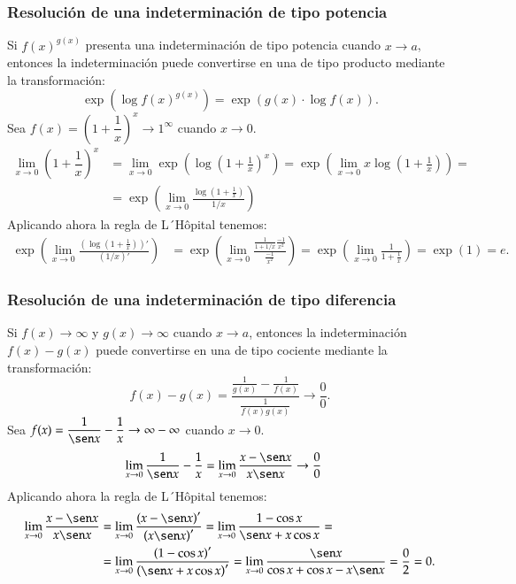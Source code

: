 	
	\begin{frame}
		\frametitle{Resolución de una indeterminación de tipo potencia}
		Si $f(x)^{g(x)}$ presenta una indeterminación de tipo potencia cuando $x\rightarrow a$, entonces la indeterminación puede convertirse en una de tipo producto mediante la transformación:
		\[
			\exp\left(\log f(x)^{g(x)}\right) = \exp\left(g(x)\cdot \log f(x)\right).
		\]
		 Sea $f(x)=\left(1+\dfrac{1}{x}\right)^{x} \rightarrow 1^\infty$ cuando $x\rightarrow 0$.
		\begin{align*}
			\lim_{x\rightarrow 0}\left(1+\dfrac{1}{x}\right)^{x} & = \lim_{x\rightarrow                                                               
			0}\exp\left(\log\left(1+\frac{1}{x}\right)^{x}\right) = \exp\left(\lim_{x\rightarrow
			0}x\log\left(1+\frac{1}{x}\right)\right) =\\
			                                                     & = \exp\left(\lim_{x\rightarrow 0}\frac{\log\left(1+\frac{1}{x}\right)}{1/x}\right) 
		\end{align*}
		Aplicando ahora la regla de L´Hôpital tenemos:
		\begin{align*}
			\exp\left(\lim_{x\rightarrow 0}\frac{\left(\log\left(1+\frac{1}{x}\right)\right)'}{\left(1/x\right)'}\right) & = 
			\exp\left(\lim_{x\rightarrow 0}\frac{\frac{1}{1+1/x}\frac{-1}{x^2}}{\frac{-1}{x^2}}\right) =
			\exp\left(\lim_{x\rightarrow 0}\frac{1}{1+\frac{1}{x}}\right)=\exp(1)=e.
		\end{align*}
	\end{frame}
	
	
	\begin{frame}
		\frametitle{Resolución de una indeterminación de tipo diferencia}
		Si $f(x)\rightarrow \infty$ y $g(x)\rightarrow \infty$ cuando $x\rightarrow a$, entonces la indeterminación $f(x)-g(x)$ puede convertirse en una de tipo cociente mediante la transformación:
		\[
			f(x)-g(x)=\frac{\frac{1}{g(x)}-\frac{1}{f(x)}}{\frac{1}{f(x)g(x)}}\rightarrow \frac{0}{0}.
		\]
		 Sea $f(x)=\dfrac{1}{\sen x}-\dfrac{1}{x} \rightarrow \infty-\infty$ cuando $x\rightarrow 0$.
		\begin{align*}
			\lim_{x\rightarrow 0} \frac{1}{\sen x}-\frac{1}{x} & = 
			\lim_{x\rightarrow 0} \frac{x-\sen x}{x\sen x} \rightarrow \frac{0}{0}
		\end{align*}
		Aplicando ahora la regla de L´Hôpital tenemos:
		\begin{align*}
			\lim_{x\rightarrow 0} \frac{x-\sen x}{x\sen x} & =                                                                                      
			\lim_{x\rightarrow 0} \frac{\left(x-\sen x\right)'}{\left(x\sen x\right)'}=
			\lim_{x\rightarrow 0} \frac{1-\cos x}{\sen x +x\cos x} = \\
			                                               & = \lim_{x\rightarrow 0} \frac{\left(1-\cos x\right)'}{\left(\sen x +x\cos x\right)'} = 
			\lim_{x\rightarrow 0} \frac{\sen x}{\cos x +\cos x-x\sen x}=\frac{0}{2}=0.
		\end{align*}
	\end{frame}
	
